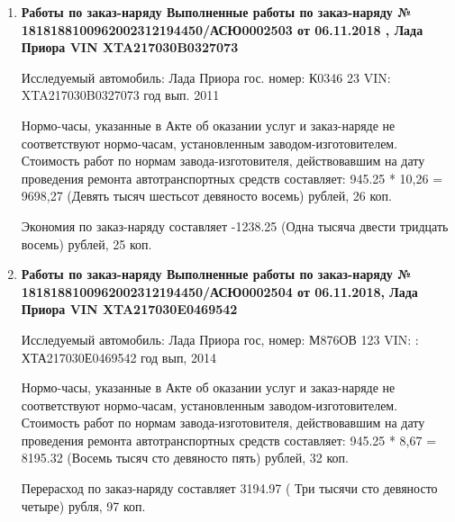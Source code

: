\begin{enumerate}

\item \par\textbf{{Работы по заказ-наряду   Выполненные работы по заказ-наряду № 1818188100962002312194450/\-АСЮ0002503 от 06.11.2018
		, Лада Приора  VIN  XTA217030B0327073}}
	
	
Исследуемый автомобиль:  Лада Приора гос. номер: К0346 23 VIN: XTA217030B0327073 год вып. 2011

	
	


Нормо-часы, указанные в Акте об оказании услуг и заказ-наряде не соответствуют нормо-часам,  установленным заводом-изготовителем.\\
Стоимость работ по нормам завода-изготовителя, действовавшим на дату проведения ремонта автотранспортных средств составляет: 945.25 * 10,26 = 9698,27 (Девять тысяч шестьсот девяносто восемь) рублей, 26 коп.

Экономия по заказ-наряду составляет -1238.25 (Одна тысяча двести тридцать восемь) рублей, 25 коп.  
\vspace{3mm}





\item \par\textbf{{Работы по заказ-наряду   Выполненные работы по заказ-наряду № 1818188100962002312194450/\-АСЮ0002504 от 06.11.2018, Лада Приора VIN XTA217030E0469542}}



Исследуемый автомобиль:  Лада Приора гос, номер: М876ОВ 123 VIN: : ХТА217030Е0469542 год вып, 2014




Нормо-часы, указанные в Акте об оказании услуг и заказ-наряде не соответствуют нормо-часам,  установленным заводом-изготовителем.\\
Стоимость работ по нормам завода-изготовителя, действовавшим на дату проведения ремонта автотранспортных средств составляет: 945.25 * 8,67 = 8195.32 (Восемь тысяч сто девяносто пять) рублей, 32 коп.

Перерасход по заказ-наряду составляет 3194.97 ( Три тысячи сто девяносто четыре) рубля, 97 коп.  
\vspace{3mm}


\z{}{}






\end{enumerate}
